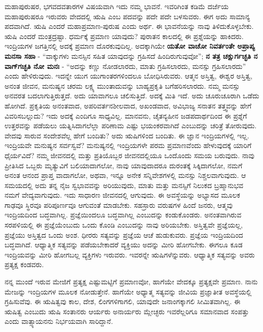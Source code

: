 ಮಹಾಪುರುಷರ, ಭಗವದವತಾರಗಳ ವಿಷಯವಾಗಿ ಇದು ನಮ್ಮ ಭಾವನೆ. ಇವರಿಗಿಂತ ಕಡಿಮೆ ದರ್ಜೆಯ ಮಹಾಪುರುಷರೂ ಇರುವರು ವೇದದಲ್ಲಿ ಋಷಿ ಎಂಬ ಪದವನ್ನು ಪದೇ ಪದೇ ಬಳಸುವರು. ಈಗ ಅದು ಸಾಮಾನ್ಯ ಪದವಾಗಿದೆ. ಋಷಿ ಎಂದರೆ ಮಹಾಪ್ರಮಾಣ-ಪುರುಷ ಎಂದು ಅರ್ಥ. ಈ ಭಾವನೆಯನ್ನು ನಾವು ತಿಳಿದುಕೊಳ್ಳಬೇಕು. ಋಷಿ ಎಂದರೆ ಮಂತ್ರದ್ರಷ್ಟಾ. ಧರ್ಮಕ್ಕೆ ಪ್ರಮಾಣ ಯಾವುದು? ಪುರಾತನ ಕಾಲದಲ್ಲಿ ಈ ಪ್ರಶ್ನೆಯನ್ನು ಹಾಕಿದರು. ಇಂದ್ರಿಯಗಳ ಜಗತ್ತಿನಲ್ಲಿ ಅದಕ್ಕೆ ಪ್ರಮಾಣ ದೊರಕುವುದಿಲ್ಲ. ಅದಕ್ಕಾಗಿಯೇ \textbf{ಯತೋ ವಾಚೋ ನಿವರ್ತಂತೇ ಅಪ್ರಾಪ್ಯ ಮನಸಾ ಸಹಾ} - “ವಾಕ್ಕುಗಳು ಮನಸ್ಸಿನ ಸಹಿತ ಯಾವುದನ್ನು ಗ್ರಹಿಸದೆ ಹಿಂದಿರುಗುವುವೋ”; \textbf{ನ ತತ್ರ ಚಕ್ಷುರ್ಗಚ್ಛತಿ ನ ವಾಗ್​ಗಚ್ಛತಿ ನೋ ಮನಃ} - “ಅದನ್ನು ಕಣ್ಣು ನೋಡಲಾರದು, ಮಾತು ಗ್ರಹಿಸಲಾರದು, ಮನಸ್ಸು ಗ್ರಹಿಸಲಾರದು” ಎಂದು ಹೇಳಿರುವುದು. ಇದನ್ನೇ ಯುಗ ಯುಗಾಂತರಗಳಿಂದಲೂ ಬೋಧಿಸಿರುವರು. ಆತ್ಮನ ಅಸ್ತಿತ್ವ, ಈಶ್ವರ ಅಸ್ತಿತ್ವ, ಅನಂತ ಜೀವನ, ಮನುಷ್ಯನ ಚರಮ ಲಕ್ಷ್ಯ ಮುಂತಾದುವನ್ನು ಬಾಹ್ಯಪ್ರಕೃತಿ ಬಗೆಹರಿಸಲಾರದು. ನಮ್ಮ ಮನಸ್ಸು ಅನವರತ ಬದಲಾಗುತ್ತಿರುತ್ತದೆ. ಅದು ಯಾವಾಗಲೂ ಚಲಿಸುತ್ತಿದೆ. ಅದಕ್ಕೆ ಮಿತಿ ಇದೆ. ಅದು ಚೂರುಚೂರಾಗಿ ಒಡೆದು ಹೋಗಿದೆ. ಪ್ರಕೃತಿಯ ಅನಂತವಾದ, ಅಪರಿವರ್ತನಶೀಲವಾದ, ಅಖಂಡವಾದ, ಅವಿಭಾಜ್ಯ ಸನಾತನ ತತ್ತ್ವವನ್ನು ಹೇಗೆ ವಿವರಿಸಬಲ್ಲುದು? ಇದು ಅದಕ್ಕೆ ಎಂದಿಗೂ ಸಾಧ್ಯವಿಲ್ಲ. ಮಾನವನು, ಚೈತನ್ಯಹೀನ ಜಡಪದಾರ್ಥದಿಂದ ಈ ಪ್ರಶ್ನೆಗೆ ಉತ್ತರವನ್ನು ಪಡೆಯಲು ಯತ್ನಿಸಿದಾಗಲೆಲ್ಲಾ ಪರಿಣಾಮ ಎಷ್ಟು ಭಯಂಕರವಾಗಿದೆ ಎಂಬುದನ್ನು ಚರಿತ್ರೆ ತೋರುವುದು. ವೇದವು ಸಾರುವ ಸಂದೇಶವೆಲ್ಲ ಹೇಗೆ ಬಂದಿತು? ಅದು ಋಷಿಗಳಿಂದ ಬಂದಿತು. ಈ ಜ್ಞಾನ ಇಂದ್ರಿಯಗಳಲ್ಲಿ ಇಲ್ಲ. ಇಂದ್ರಿಯವೇ ಮನುಷ್ಯನ ಸರ್ವಸ್ವವೆ? ಮನುಷ್ಯನಲ್ಲಿ ಇಂದ್ರಿಯಗಳೇ ಪರಮ ಪ್ರಮಾಣವೆಂದು ಹೇಳುವುದಕ್ಕೆ ಯಾರಿಗೆ ಧೈರ್ಯವಿದೆ? ನಮ್ಮ ಜೀವನದಲ್ಲಿ ಮತ್ತು ಪ್ರತಿಯೊಬ್ಬರ ಜೀವನದಲ್ಲಿಯೂ ಒಂದೊಂದು ಸಮಯ ಬರುವುದು. ನಾವು ಪ್ರೀತಿಸಿದ ಒಬ್ಬರು ಮೃತ್ಯುವಿಗೆ ಬಲಿಯಾದಾಗಲೋ, ನಾವು ಯಾವುದಾದರೂ ದುರಂತಕ್ಕೆ ಸಿಕ್ಕಿದಾಗಲೋ, ನಮಗೆ ಅನಂತ ಆನಂದ ಪ್ರಾಪ್ತ ವಾದಾಗಲೋ, ಅಥವಾ, ಇನ್ನೂ ಅನೇಕ ಸನ್ನಿವೇಶಗಳಲ್ಲಿ ಮನಸ್ಸು ನಿಶ್ಚಲವಾಗುವುದು. ಆ ಸಮಯದಲ್ಲಿ ಅದು ತನ್ನ ನೈಜ ಸ್ವಭಾವವನ್ನು ಅರಿಯುವುದು, ಮಾತು ಮತ್ತು ಮನಸ್ಸಿಗೆ ನಿಲುಕದ ಬ್ರಹ್ಮಾನುಭವ ನಮಗೆ ವೇದ್ಯವಾಗುವುದು. ಇದು ಸಾಧಾರಣ ಜೀವನದಲ್ಲಿ ಆಗುವುದು. ಈ ಅವಸ್ಥೆಯನ್ನು ಅಭ್ಯಾಸದ ಮೂಲಕ ಗಾಢವೂ ಸ್ಥಿರವೂ ಪರಿಪೂರ್ಣವೂ ಆಗುವಂತೆ ಮಾಡಬೇಕು. ಸಹಸ್ರಾರು ವರುಷಗಳ ಹಿಂದೆ ಜನರು, ಆತ್ಮವು ಇಂದ್ರಿಯದಿಂದ ಬದ್ಧವಾಗಿಲ್ಲ. ಪ್ರಜ್ಞೆಯಿಂದಲೂ  ಬದ್ಧವಾಗಿಲ್ಲ ಎಂಬುದನ್ನು ಕಂಡುಕೊಂಡರು. ಅನಂತವಾಗಿರುವ ಸರಪಳಿಯಲ್ಲಿ ಈ ಪ್ರಜ್ಞೆಯೆಂಬುದು ಒಂದು ಕೊಂಡಿ ಎಂಬುದನ್ನು ನಾವು ಅರಿಯಬೇಕು. ಅಸ್ತಿತ್ವವೇ ಪ್ರಜ್ಞೆಯಲ್ಲ, ಪ್ರಜ್ಞೆಯು ಅಸ್ತಿತ್ವದ ಒಂದು ಅಂಶ. ಧೀರರು ಸತ್ಯವನ್ನು ಪ್ರಜ್ಞೆಯ ಆಚೆ ಹುಡುಕುವರು. ಪ್ರಜ್ಞೆಯ ಇಂದ್ರಿಯದಿಂದ ಬದ್ಧವಾಗಿದೆ. ಆಧ್ಯಾತ್ಮಿಕ ಸತ್ಯವನ್ನು ಪಡೆಯಬೇಕಾದರೆ ವ್ಯಕ್ತಿಯು ಅದನ್ನು ಮೀರಿ ಹೋಗಬೇಕು. ಈಗಲೂ ಕೂಡ ಇಂದ್ರಿಯವನ್ನು ಮೀರಿ ಹೋಗಬಲ್ಲ ವ್ಯಕ್ತಿಗಳು ಇರುವರು. ಇವರನ್ನೇ ಋಷಿಗಳೆನ್ನುವರು. ಆಧ್ಯಾತ್ಮಿಕ ಸತ್ಯವನ್ನು ಅವರು ಪ್ರತ್ಯಕ್ಷ ಕಂಡವರು.

ನನ್ನ ಮುಂದೆ ಇರುವ ಮೇಜಿಗೆ ಪ್ರತ್ಯಕ್ಷ ಎಷ್ಟುಮಟ್ಟಿಗೆ ಪ್ರಮಾಣವೋ, ಹಾಗೆಯೇ ವೇದಕ್ಕೂ ಪ್ರತ್ಯಕ್ಷವೇ ಪ್ರಮಾಣ. ನಾನು ಮೇಜನ್ನು ಇಂದ್ರಿಯಗಳ ಮೂಲಕ ನೋಡುತ್ತೇನೆ. ಹಾಗೆಯೇ ಅಧ್ಯಾತ್ಮ ಸತ್ಯವನ್ನು ಜೀವಿಯ ಪ್ರಜ್ಞಾತೀತ ಅವಸ್ಥೆಯಲ್ಲಿ ಗ್ರಹಿಸುವೆವು. ಈ ಋಷಿತ್ವವು ಕಾಲ, ದೇಶ, ಲಿಂಗಗಳಿಗಾಗಲಿ, ಯಾವುದೇ ಜನಾಂಗಕ್ಕಾಗಲಿ ಸೀಮಿತವಾಗಿಲ್ಲ. ಈ ಋಷಿತ್ವ ಎಂಬುದು ಋಷಿ ಸಂತಾನರು ಆರ್ಯರು ಅನಾರ್ಯರು ಮ್ಲೇಚ್ಛರು ಇವರೆಲ್ಲರಿಗೂ ಸಮಾನವಾದ ಸಂಪತ್ತು ಎಂದು ವಾತ್ಸ್ಯಾಯನನು ನಿರ್ಭಯವಾಗಿ ಸಾರಿದ್ದಾನೆ.

